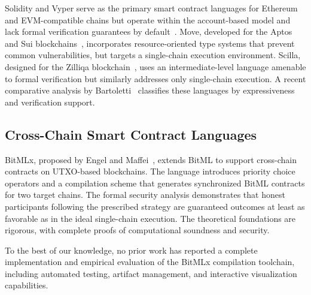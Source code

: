 \documentclass[journal]{IEEEtran}
\begin{document}
Solidity and Vyper serve as the primary smart contract languages for Ethereum~\cite{wood2014ethereum} and EVM-compatible chains but operate within the account-based model and lack formal verification guarantees by default~\cite{tikhomirov2018smartcheck}. Move, developed for the Aptos and Sui blockchains~\cite{amsden2020move}, incorporates resource-oriented type systems that prevent common vulnerabilities, but targets a single-chain execution environment. Scilla, designed for the Zilliqa blockchain~\cite{sergey2019scilla}, uses an intermediate-level language amenable to formal verification but similarly addresses only single-chain execution. A recent comparative analysis by Bartoletti~\cite{bartoletti2025comparison} classifies these languages by expressiveness and verification support.

\subsection{Cross-Chain Smart Contract Languages}

BitMLx, proposed by Engel and Maffei~\cite{engel2025bitmlx}, extends BitML to support cross-chain contracts on UTXO-based blockchains. The language introduces priority choice operators and a compilation scheme that generates synchronized BitML contracts for two target chains. The formal security analysis demonstrates that honest participants following the prescribed strategy are guaranteed outcomes at least as favorable as in the ideal single-chain execution. The theoretical foundations are rigorous, with complete proofs of computational soundness and security.

To the best of our knowledge, no prior work has reported a complete implementation and empirical evaluation of the BitMLx compilation toolchain, including automated testing, artifact management, and interactive visualization capabilities.
\end{document}
